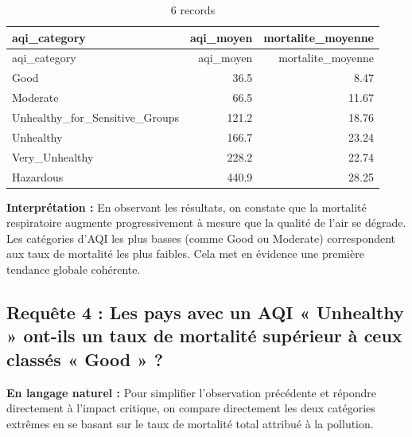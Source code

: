 \documentclass[mstat,12pt]{unswthesis}
\begin{document}
\begin{longtable}[]{@{}lrr@{}}
\caption{6 records}\tabularnewline
\toprule\noalign{}
aqi\_category & aqi\_moyen & mortalite\_moyenne \\
\midrule\noalign{}
\endfirsthead
\toprule\noalign{}
aqi\_category & aqi\_moyen & mortalite\_moyenne \\
\midrule\noalign{}
\endhead
\bottomrule\noalign{}
\endlastfoot
Good & 36.5 & 8.47 \\
Moderate & 66.5 & 11.67 \\
Unhealthy\_for\_Sensitive\_Groups & 121.2 & 18.76 \\
Unhealthy & 166.7 & 23.24 \\
Very\_Unhealthy & 228.2 & 22.74 \\
Hazardous & 440.9 & 28.25 \\
\end{longtable}

\textbf{Interprétation :} En observant les résultats, on constate que la
mortalité respiratoire augmente progressivement à mesure que la qualité
de l'air se dégrade. Les catégories d'AQI les plus basses (comme Good ou
Moderate) correspondent aux taux de mortalité les plus faibles. Cela met
en évidence une première tendance globale cohérente.

\medskip

\subsection{Requête 4 : Les pays avec un AQI « Unhealthy » ont-ils un
taux de mortalité supérieur à ceux classés « Good »
?}\label{requuxeate-4-les-pays-avec-un-aqi-unhealthy-ont-ils-un-taux-de-mortalituxe9-supuxe9rieur-uxe0-ceux-classuxe9s-good}

\textbf{En langage naturel :} Pour simplifier l'observation précédente
et répondre directement à l'impact critique, on compare directement les
deux catégories extrêmes en se basant sur le taux de mortalité total
attribué à la pollution.
\end{document}

